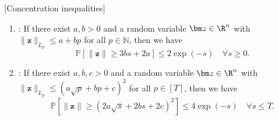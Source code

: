 \documentclass[11pt, a4paper, oneside, reqno]{article}
\begin{document}
	\begin{lemma} \label{lemma:probability101} [Concentration inequalities]~
		\begin{enumerate} [label=(\roman*)]
			\item 
			\label{lemma:sub-exponential1}
			{\citep[Lemma~11]{bach2013adaptivity}:}
			If there exist $a,b>0$ and a random variable $\bm z \in \R^n$  with $ \| \bm z \|_{L_p} \leq a + b p $ for all $p \in \mathbb N$, then we have
			$$ \mathbb P \left[ \| \bm z \| \geq 3 b s + 2 a \right] \leq 2 \exp(-s)\quad \forall s \geq 0. $$
			
			\item
			\label{lemma:sub-exponential2}
			{\citep[Lemma~12]{bach2013adaptivity}:}
			If there exist $a,b,c>0$ and a random variable $\bm z \in \R^n$  with $ \| \bm z \|_{L_p} \leq (a \sqrt{p} + b p + c)^2 $ for all $p \in [T]$, then we have
			$$ \mathbb P \left[ \| \bm z \| \geq (2 a \sqrt{s} + 2 b s + 2 c)^2 \right] \leq 4 \exp(-s)\quad \forall s \leq T. $$
		\end{enumerate}
	\end{lemma}
	
\end{document}
